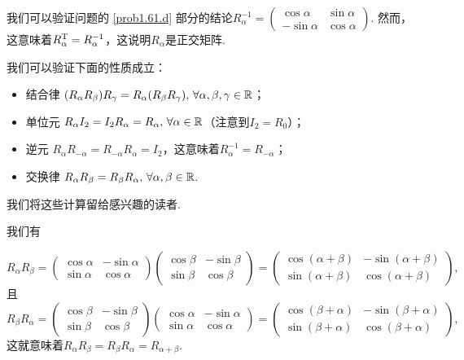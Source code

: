 \begin{solution}
  \begin{enuma}
    \item 我们可以验证问题的 \ref{prob1.61.d} 部分的结论$R_\alpha^{-1}=\begin{pmatrix}
          \cos\alpha & \sin\alpha \\
          -\sin\alpha & \cos\alpha
        \end{pmatrix}$. 然而，这意味着$R_\alpha^{\mathrm T}=R_\alpha^{-1}$，这说明$R_\alpha$是正交矩阵.
    \item 我们可以验证下面的性质成立：
  \end{enuma}
  \begin{itemize}
      \item {\kaishu 结合律} $(R_\alpha R_\beta)R_\gamma=R_\alpha (R_\beta R_\gamma),\,\forall \alpha,\beta,\gamma\in\mathbb R$；
      \item {\kaishu 单位元} $R_\alpha I_2=I_2R_\alpha=R_\alpha,\,\forall \alpha\in\mathbb R$（注意到$I_2=R_0$）；
      \item {\kaishu 逆元} $R_\alpha R_{-\alpha}
      =R_{-\alpha}R_\alpha = I_2$，这意味着$R_\alpha^{-1}=R_{-\alpha}$；
      \item {\kaishu 交换律} $R_\alpha R_\beta = R_\beta R_\alpha,\,\forall \alpha,\beta\in\mathbb R$.
    \end{itemize}
    我们将这些计算留给感兴趣的读者.

    \begin{enuma}
      \setcounter{enumi}{2}
      \item 我们有
    \end{enuma}
      \[
         R_\alpha R_\beta = \begin{pmatrix}
           \cos\alpha & -\sin\alpha \\
           \sin\alpha & \cos\alpha
         \end{pmatrix} \begin{pmatrix}
           \cos\beta & - \sin\beta \\
           \sin\beta & \cos\beta
         \end{pmatrix}
         = \begin{pmatrix}
           \cos(\alpha +\beta) & - \sin(\alpha +\beta) \\
           \sin (\alpha +\beta)  & \cos (\alpha +\beta)
         \end{pmatrix},
      \]
      且
      \[
         R_\beta R_\alpha =  \begin{pmatrix}
           \cos\beta & - \sin\beta \\
           \sin\beta & \cos\beta
         \end{pmatrix}\begin{pmatrix}
           \cos\alpha & -\sin\alpha \\
           \sin\alpha & \cos\alpha
         \end{pmatrix}
         = \begin{pmatrix}
           \cos(\beta + \alpha) & - \sin(\beta + \alpha) \\
           \sin (\beta + \alpha)  & \cos (\beta + \alpha)
         \end{pmatrix},
      \]
      这就意味着$R_\alpha R_\beta = R_\beta R_\alpha = R_{\alpha+\beta}$.


\end{solution}
